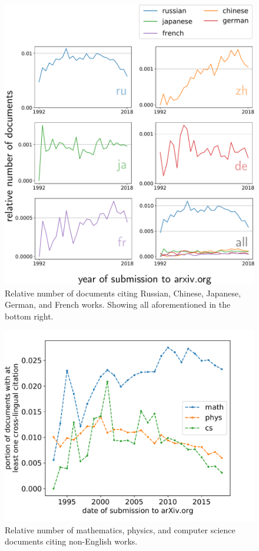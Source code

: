 \begin{figure}[tb]
\centering
\includegraphics[width=0.7\linewidth]{figures/ref_xling/relative_language_counts_across_time_mod_twocolumn.pdf}
\caption[Relative number of documents citing Russian, Chinese, Japanese, German, and French works]{Relative number of documents citing Russian, Chinese, Japanese, German, and French works. Showing all aforementioned in the bottom right.} \label{fig:previntime}
\end{figure}

\begin{figure}[tb]
\centering
\includegraphics[width=0.7\linewidth]{figures/ref_xling/relative_number_of_papers_lessthan64.pdf}
\caption{Relative number of mathematics, physics, and computer science documents citing non-English works.} \label{fig:prevperdisc}
\end{figure}

